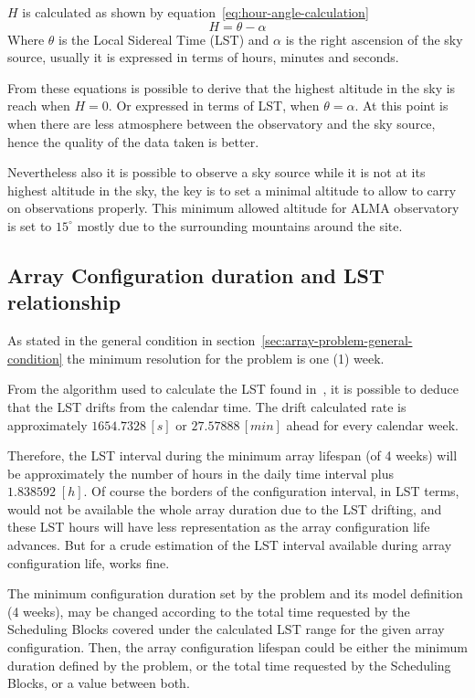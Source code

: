$H$ is calculated as shown by equation~\ref{eq:hour-angle-calculation}
\begin{equation}
\label{eq:hour-angle-calculation}
H = \theta - \alpha
\end{equation}
Where $\theta$ is the Local Sidereal Time (LST) and $\alpha$ is the right ascension of the sky source, usually it is expressed in terms of hours, minutes and seconds.

From these equations is possible to derive that the highest altitude in the sky is reach when $H = 0$. Or expressed in terms of LST, when $\theta = \alpha$. At this point is when there are less atmosphere between the observatory and the sky source, hence the quality of the data taken is better.

Nevertheless also it is possible to observe a sky source 
while it is not at its highest altitude in the sky, the key is to set a minimal altitude to allow to carry on observations properly. This minimum allowed altitude for ALMA observatory is set to $15^\circ$ mostly due to the surrounding mountains around the site. 

\subsection{Array Configuration duration and LST relationship}
As stated in the general condition in section~\ref{sec:array-problem-general-condition} the minimum resolution for the problem is one (1) week.

From the algorithm used to calculate the LST found in~\cite{kaplan05}, it is possible to deduce that the LST drifts from the calendar time. The drift calculated rate is approximately $1654.7328\,[s]$ or $27.57888\,[min]$ ahead for every calendar week.

Therefore, the LST interval during the minimum array lifespan (of 4 weeks) will be approximately the number of hours in the daily time interval plus $1.838592\;[h]$.
Of course the borders of the configuration interval, in LST terms, would not be available the whole array duration due to the LST drifting, and these LST hours will have less representation as the array configuration life advances. But for a crude estimation of the LST interval available during array configuration life, works fine.

The minimum configuration duration set by the problem and its model definition (4 weeks), may be changed according to the total time requested by the Scheduling Blocks covered under the calculated LST range for the given array configuration. Then, the array configuration lifespan could be either the minimum duration defined by the problem, or the total time requested by the Scheduling Blocks, or a value between both.

